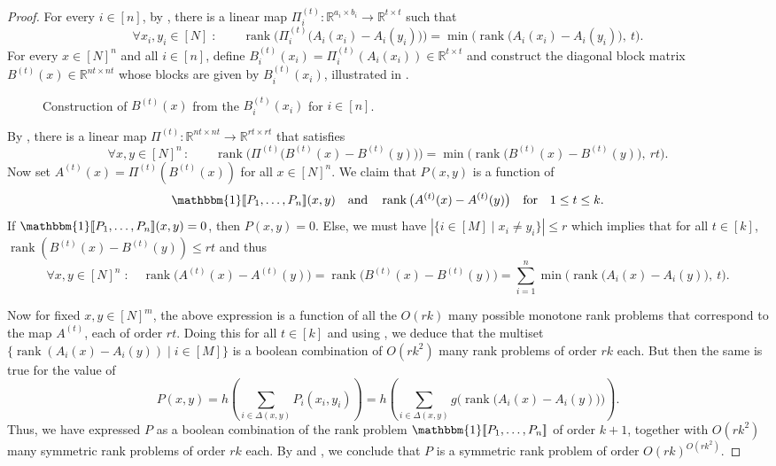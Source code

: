 \documentclass{article}
\DeclareMathOperator{\rank}{rank}
\newcommand{\R}{\mathbb{R}}
\begin{document}
\begin{proof}
For every $i\in[n]$, by , there is a linear map $\Pi^{(t)}_i \colon \R^{a_i\times b_i}\to \R^{t \times t}$ such
that
\[
    \forall x_i, y_i \in[N] \;\colon\qquad
        \rank\!\Big(\Pi^{(t)}_i\big(A_i(x_i)-A_i(y_i)\big)\Big)
        = \min\!\Big(\rank\!\big(A_i(x_i)-A_i(y_i)\big),\ t\Big).
\]
For every $x \in [N]^n$ and all $i\in [n]$, define $B^{(t)}_i(x_i) =
\Pi^{(t)}_i(A_i(x_i)) \in \R^{t\times t}$ and construct the diagonal block matrix $B^{(t)}(x)\in \R^{nt \times nt}$ whose blocks are given by $B^{(t)}_i(x_i)$, illustrated in .
\begin{figure}[t]
	\begin{center}
		
		\caption{Construction of $B^{(t)}(x)$ from the $B^{(t)}_i(x_i)$ for $i\in [n]$.}
		\label{fig:composition}
	\end{center}
\end{figure}
By , there is a linear map $\Pi^{(t)}\colon \R^{nt\times
nt}\to \R^{rt\times rt}$ that satisfies
\[
	\forall x,y\in[N]^n\,\colon\qquad \rank\!\Big(\Pi^{(t)}\big(B^{(t)}(x)-B^{(t)}(y)\big)\Big)
            = \min\!\Big(\rank\!\big(B^{(t)}(x)-B^{(t)}(y)\big),\ rt \Big).
\]
Now set $A^{(t)}(x) = \Pi^{(t)}(B^{(t)}(x))$ for all $x\in [N]^n$. We claim that $P(x,y)$ is a function of
\[
	\mathbbm{1}\ldsbracket P_1, \dotsc, P_n \rdsbracket (x,y)
            \quad\text{and}\quad
        \rank\big(A^{(t)}(x)-A^{(t)}(y)\big) \quad \text{for} \quad 1\leq t\leq k.
\]
If $\mathbbm{1}\ldsbracket P_1, \dotsc, P_n \rdsbracket (x,y) = 0$, then $P(x,y)
= 0$. Else, we must have $|\{i\in [M]\mid x_i\neq y_i\}| \leq r$ which implies
that for all $t \in [k]$, $\rank(B^{(t)}(x)-B^{(t)}(y)) \leq rt$ and thus
\[
 \forall x,y\in[N]^n \;\colon\quad \rank\!\Big(A^{(t)}(x)-A^{(t)}(y)\Big)
    = \rank\!\Big(B^{(t)}(x)-B^{(t)}(y)\Big)
    = \sum_{i = 1}^n \min\!\Big(\rank\!\big(A_i(x)-A_i(y)\big),\ t\Big).
\]

Now for fixed $x,y\in [N]^m$, the above expression is a function of all the $O(rk)$ many possible monotone rank problems that correspond to the map $A^{(t)}$, each of order $rt$.
Doing this for all $t\in [k]$ and using , we deduce that the multiset $\{\rank(A_i(x)-A_i(y))\mid i\in [M]\}$ is a boolean combination of $O(rk^2)$ many rank problems of order $rk$ each. But then the same is true for the value of
\[
	P(x,y) = h\!\left(\sum_{i \in \Delta(x,y)}P_i(x_i,y_i)\right) = h\!\left(\sum_{i \in \Delta(x,y)} g\Big(\rank\!\big(A_i(x)-A_i(y)\big)\Big)\right).
\]
Thus, we have expressed $P$ as a boolean combination of the rank problem $\mathbbm{1}\ldsbracket P_1, \dotsc, P_n \rdsbracket$ of order $k+1$, together with $O(rk^2)$ many symmetric rank problems of order $rk$ each. By  and , we conclude that $P$ is a symmetric rank problem of order $O(rk)^{O(rk^2)}$.
\end{proof}
\end{document}
